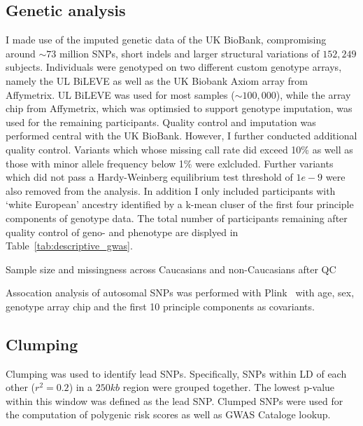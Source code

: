 \subsection{Genetic analysis}
\label{sub:genetic_analysis}
I made use of the imputed genetic data of the UK BioBank, compromising around $\sim73$ million SNPs, short indels and larger structural variations of $152,249$ subjects.
Individuals were genotyped on two different custom genotype arrays, namely the UL BiLEVE as well as the UK Biobank Axiom array from Affymetrix. 
UL BiLEVE was used for most samples ($\sim100,000$), while the array chip from Affymetrix, which was optimsied to support genotype imputation, was used for the remaining participants. 
Quality control and imputation was performed central with the UK BioBank.
However, I further conducted additional quality control.
Variants which whose missing call rate did exceed 10\% as well as those with minor allele frequency below 1\% were exlcluded.
Further variants which did not pass a Hardy-Weinberg equilibrium test threshold of $1e-9$ were also removed from the analysis.
In addition I only included participants with `white European' ancestry identified by a k-mean cluser of the first four principle components of genotype data.
The total number of participants remaining after quality control of geno- and phenotype are displyed in Table~\ref{tab:descriptive_gwas}.

\begin{table}[!htpb]
	\centering
	\caption{Sample size and missingness across Caucasians and non-Caucasians after QC}\label{tab:descriptive_gwas} 
	\resizebox{\textwidth}{!}{}
\end{table}

Assocation analysis of autosomal SNPs was performed with Plink~\cite{Purcell2007,Chang2015} with age, sex, genotype array chip and the first 10 principle components as covariants.

\subsection{Clumping}
\label{sub:Clumping}

Clumping was used to identify lead SNPs.
Specifically, SNPs within LD of each other ($r^2=0.2$) in a $250kb$ region were grouped together.
The lowest p-value within this window was defined as the lead SNP\@.
Clumped SNPs were used for the computation of polygenic risk scores as well as GWAS Cataloge lookup.

